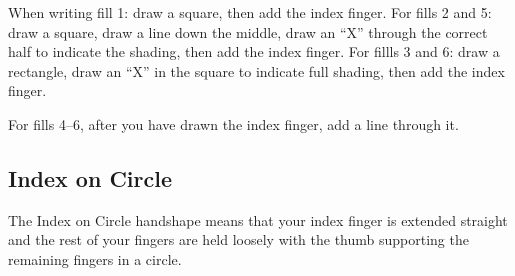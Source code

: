 \documentclass{article}
\begin{document}
When writing fill 1: draw a square, then add the index finger.
For fills 2 and 5: draw a square, draw a line down the middle, draw an ``X'' through the correct half to indicate the shading, then add the index finger.
For fillls 3 and 6: draw a rectangle, draw an ``X'' in the square to indicate full shading, then add the index finger.

For fills 4--6, after you have drawn the index finger, add a line through it.

\subsection{Index on Circle}

The Index on Circle handshape means that your index finger is extended straight and the rest of your fingers are held loosely with the thumb supporting the remaining fingers in a circle.
\end{document}
